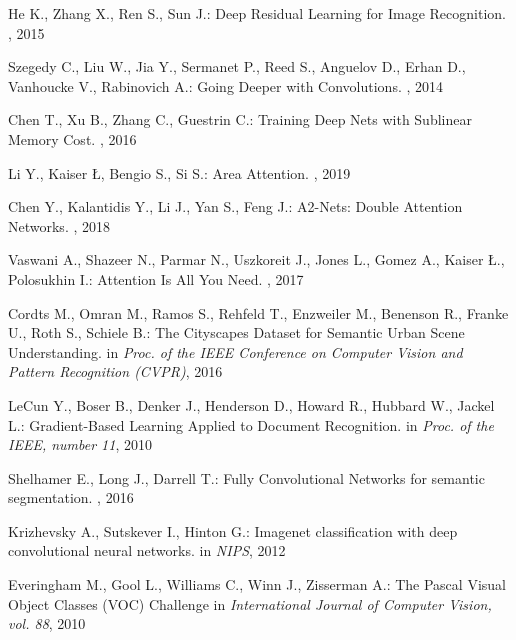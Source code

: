 \documentclass{article}
\begin{document}
\clearpage
\begin{thebibliography}{1}

He K., Zhang X., Ren S., Sun J.:
\newblock Deep Residual Learning for Image Recognition. 
, 2015

Szegedy C., Liu W., Jia Y., Sermanet P., Reed S., Anguelov D., Erhan D., Vanhoucke V., Rabinovich A.: 
\newblock Going Deeper with Convolutions.
, 2014

Chen T., Xu B., Zhang C., Guestrin C.:
\newblock Training Deep Nets with Sublinear Memory Cost.
, 2016

Li Y., Kaiser Ł, Bengio S., Si S.:
\newblock Area Attention.
, 2019

Chen Y., Kalantidis Y., Li J., Yan S., Feng J.:
\newblock A2-Nets: Double Attention Networks.
, 2018

Vaswani A., Shazeer N., Parmar N., Uszkoreit J., Jones L., Gomez A., Kaiser Ł., Polosukhin I.:
\newblock Attention Is All You Need.
, 2017

Cordts M., Omran M., Ramos S., Rehfeld T., Enzweiler M., Benenson R., Franke U., Roth S., Schiele B.:
\newblock The Cityscapes Dataset for Semantic Urban Scene Understanding.
\newblock in {\em Proc. of the IEEE Conference on Computer Vision and Pattern Recognition (CVPR)}, 2016


LeCun Y.,  Boser B., Denker J., Henderson D., Howard R., Hubbard W., Jackel  L.:
\newblock Gradient-Based Learning Applied to Document Recognition.
\newblock in {\em Proc. of the IEEE, number 11}, 2010


Shelhamer E., Long J., Darrell T.:
\newblock Fully Convolutional Networks for semantic segmentation.
, 2016


Krizhevsky A., Sutskever I., Hinton G.:
\newblock Imagenet classification with deep convolutional neural networks.
\newblock in {\em NIPS}, 2012


Everingham M., Gool L., Williams C., Winn J., Zisserman A.:
\newblock The Pascal Visual Object Classes (VOC) Challenge
\newblock in {\em International Journal of Computer Vision, vol. 88}, 2010



\end{thebibliography}
\end{document}

